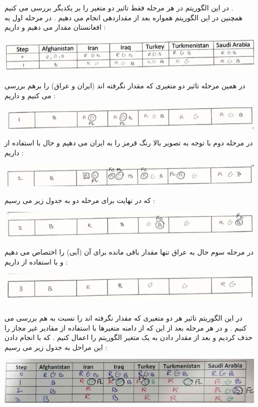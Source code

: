 \documentclass{article}
\begin{document}
\subsubsection*{\textcolor{red}{}}
در این الگوریتم در هر مرحله فقط تاثیر دو متغیر را بر یکدیگر بررسی می کنیم  . \\
همچنین در این الگوریتم همواره بعد از مقداردهی 
انجام می دهیم  . 
در مرحله اول به افغانستان مقدار می دهیم و داریم  : 
\begin{center}
	\includegraphics[width=1\textwidth]{q6p2}
\end{center}
در همین   مرحله تاثیر دو متغیری که مقدار نگرفته اند (ایران و عراق) را برهم بررسی می کنیم و داریم  : 
\begin{center}
	\includegraphics[width=1\textwidth]{q6p3}
\end{center}
در مرحله دوم  با توجه به تصویر بالا رنگ قرمز را به ایران می دهیم و حال با استفاده از 
داریم : 
\begin{center}
	\includegraphics[width=1\textwidth]{q6p4}
\end{center}
که در نهایت برای مرحله دو به جدول زیر می رسیم   : 
\begin{center}
	\includegraphics[width=1\textwidth]{q6p5}
\end{center}
در مرحله سوم حال به عراق تنها مقدار باقی مانده برای آن (آبی) را اختصاص می دهیم و با استفاده از 
داریم  : 
\begin{center}
	\includegraphics[width=1\textwidth]{q6p6}
\end{center}
\subsubsection*{\textcolor{red}{}}
در این الگوریتم تاثیر هر دو متغیری که مقدار نگرفته اند را نسبت به هم بررسی می کنیم  . و در هر مرحله بعد از این که از دامنه متغیرها با استفاده از 
مقادیر غیر مجاز را حذف کردیم  و بعد از مقدار دادن به یک متغیر الگوریتم 
  را اعمال کنیم . که با انجام دادن این مراحل به جدول زیر می رسیم  : 
  
\begin{center}
	\includegraphics[width=1\textwidth]{q6p7}
\end{center}
\end{document}
